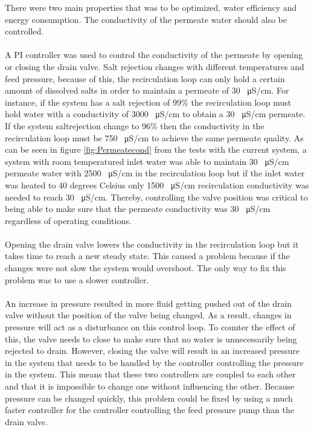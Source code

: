 There were two main properties that was to be optimized, water efficiency and energy consumption. The conductivity of the permeate water should also be controlled.\\
\\
A PI controller was used to control the conductivity of the permeate by opening or closing the drain valve. Salt rejection changes with different temperatures and feed pressure, because of this, the recirculation loop can only hold a certain amount of dissolved salts in order to maintain a permeate of 30 \SI{}{\micro\siemens}/cm. For instance, if the system has a salt rejection of 99\% the recirculation loop must hold water with a conductivity of 3000 \SI{}{\micro\siemens}/cm to obtain a 30 \SI{}{\micro\siemens}/cm permeate. If the system saltrejection change to 96\% then the conductivity in the recirculation loop must be 750 \SI{}{\micro\siemens}/cm to achieve the same permeate quality. As can be seen in figure \ref{fig:Permeatecond} from the tests with the current system, a system with room temperatured inlet water was able to maintain 30 \SI{}{\micro\siemens}/cm permeate water with 2500 \SI{}{\micro\siemens}/cm in the recirculation loop but if the inlet water was heated to 40 degrees Celsius only 1500 \SI{}{\micro\siemens}/cm recirculation conductivity was needed to reach 30 \SI{}{\micro\siemens}/cm. Thereby, controlling the valve position was critical to being able to make sure that the permeate conductivity was 30 \SI{}{\micro\siemens}/cm regardless of operating conditions. \\
\\
Opening the drain valve lowers the conductivity in the recirculation loop but it takes time to reach a new steady state. This caused a problem because if the changes were not slow the system would overshoot. The only way to fix this problem was to use a slower controller.\\
\\
An increase in pressure resulted in more fluid getting pushed out of the drain valve without the position of the valve being changed. As a result, changes in pressure will act as a disturbance on this control loop. To counter the effect of this, the valve needs to close to make sure that no water is unnecessarily being rejected to drain. However, closing the valve will result in an increased pressure in the system that needs to be handled by the controller controlling the pressure in the system. This means that these two controllers are coupled to each other and that it is impossible to change one without influencing the other. Because pressure can be changed quickly, this problem could be fixed by using a much faster controller for the controller controlling the feed pressure pump than the drain valve.\\
